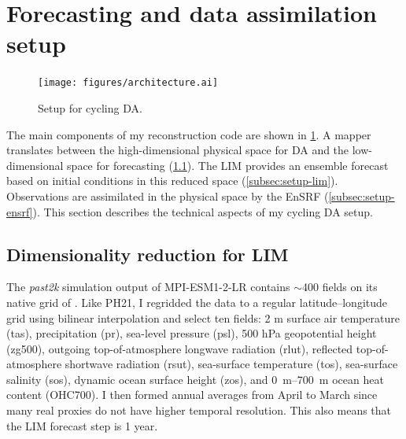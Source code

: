 \documentclass[parskip=half,DIV=16]{scrartcl}
\begin{document}
\section{Forecasting and data assimilation setup}

\begin{figure}[h]
    \centering
    \texttt{[image: figures/architecture.ai]}
    \caption{Setup for cycling \gls{DA}.}
    \label{fig:arch}
\end{figure}

The main components of my reconstruction code are shown in \cref{fig:arch}. A mapper translates between the high-dimensional physical space for \gls{DA} and the low-dimensional space for forecasting (\cref{subsec:setup-dimred}). The \gls{LIM} provides an ensemble forecast based on initial conditions in this reduced space (\cref{subsec:setup-lim}). Observations are assimilated in the physical space by the \gls{EnSRF} (\cref{subsec:setup-ensrf}). This section describes the technical aspects of my cycling \gls{DA} setup.


\subsection{Dimensionality reduction for LIM}
\label{subsec:setup-dimred}

The \emph{past2k} simulation output of MPI-ESM1-2-LR contains $\sim$400 fields on its native grid of . Like PH21, I regridded the data to a regular  latitude--longitude grid using bilinear interpolation and select ten fields: 2 m surface air temperature (tas), precipitation (pr), sea-level pressure (psl), 500 hPa geopotential height (zg500), outgoing top-of-atmosphere longwave radiation (rlut), reflected top-of-atmosphere shortwave radiation (rsut), sea-surface temperature (tos), sea-surface salinity (sos), dynamic ocean surface height (zos), and \qtyrange{0}{700}{m} ocean heat content (OHC700). I then formed annual averages from April to March since many real proxies do not have higher temporal resolution. This also means that the \gls{LIM} forecast step is 1 year.
\end{document}
